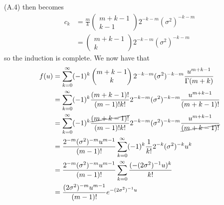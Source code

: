 \documentclass[12pt]{report}
\newcommand{\sumlim}[3]{\sum\limits_{#1 = #2}^{#3}}
\newcommand{\comb}[2]{\begin{pmatrix}#1 \\ #2\end{pmatrix}}
\begin{document}
(A.4) then becomes
\begin{align*}
    c_k &= \frac{m}{k}\comb{m+k-1}{k-1}2^{-k-m}(\sigma^2)^{-k-m} \\
    &= \comb{m+k-1}{k}2^{-k-m}(\sigma^2)^{-k-m}
\end{align*}
so the induction is complete. We now have that
\begin{align*}
    f(u) &= \sumlim{k}{0}{\infty}(-1)^k\comb{m+k-1}{k}2^{-k-m}(\sigma^2)^{-k-m}\frac{u^{m+k-1}}{\Gamma(m+k)} \\
    &= \sumlim{k}{0}{\infty}(-1)^k\frac{(m+k-1)!}{(m-1)!k!}2^{-k-m}(\sigma^2)^{-k-m}\frac{u^{m+k-1}}{(m+k-1)!} \\
    &= \sumlim{k}{0}{\infty}(-1)^k\frac{\cancel{(m+k-1)!}}{(m-1)!k!}2^{-k-m}(\sigma^2)^{-k-m}\frac{u^{m+k-1}}{\cancel{(m+k-1)!}} \\
    &= \frac{2^{-m}(\sigma^2)^{-m}u^{m-1}}{(m-1)!}\sumlim{k}{0}{\infty}(-1)^k\frac{1}{k!}2^{-k}(\sigma^2)^{-k}u^{k} \\
    &= \frac{2^{-m}(\sigma^2)^{-m}u^{m-1}}{(m-1)!}\sumlim{k}{0}{\infty}\frac{(-(2\sigma^2)^{-1}u)^k}{k!} \\
    &= \frac{(2\sigma^2)^{-m}u^{m-1}}{(m-1)!}e^{-(2\sigma^2)^{-1}u}
\end{align*}
\end{document}
